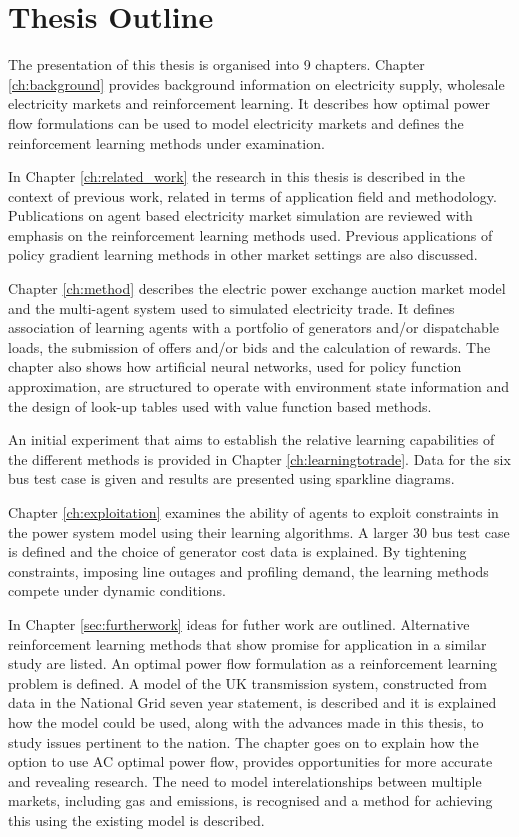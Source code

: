 \section{Thesis Outline}
The presentation of this thesis is organised into 9 chapters.  Chapter
\ref{ch:background} provides background information on electricity supply,
wholesale electricity markets and reinforcement learning.  It describes how
optimal power flow formulations can be used to model electricity markets and
defines the reinforcement learning methods under examination.

In Chapter \ref{ch:related_work} the research in this thesis is described in
the context of previous work, related in terms of application field and
methodology.  Publications on agent based electricity market simulation are
reviewed with emphasis on the reinforcement learning methods used.
Previous applications of policy gradient learning methods in other market
settings are also discussed.

Chapter \ref{ch:method} describes the electric power exchange auction market
model and the multi-agent system used to simulated electricity trade.  It
defines association of learning agents with a portfolio of generators
and/or dispatchable loads, the submission of offers and/or bids and the
calculation of rewards. The chapter also shows how artificial neural networks,
used for policy function approximation, are structured to operate with
environment state information and the design of look-up tables used with value
function based methods.

An initial experiment that aims to establish the relative learning capabilities
of the different methods is provided in Chapter \ref{ch:learningtotrade}.  Data
for the six bus test case is given and results are presented using sparkline
diagrams.

Chapter \ref{ch:exploitation} examines the ability of agents to exploit
constraints in the power system model using their learning algorithms.  A
larger 30 bus test case is defined and the choice of generator cost data is
explained. By tightening constraints, imposing line outages and profiling
demand, the learning methods compete under dynamic conditions.

In Chapter \ref{sec:furtherwork} ideas for futher work are outlined.
Alternative reinforcement learning methods that show promise for
application in a similar study are listed.  An optimal power flow formulation
as a reinforcement learning problem is defined.  A model of the UK transmission
system, constructed from data in the National Grid seven year statement, is
described and it is explained how the model could be used, along with the
advances made in this thesis, to study issues pertinent to the nation.  The
chapter goes on to explain how the option to use AC optimal power flow,
provides opportunities for more accurate and revealing research.  The need to
model interelationships between multiple markets, including gas and emissions,
is recognised and a method for achieving this using the existing model is
described.

